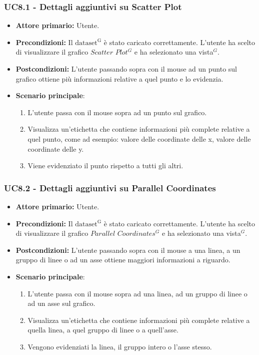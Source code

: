 \subsubsection{UC8.1 - Dettagli aggiuntivi su Scatter Plot}
\label{sec:UC8.1}
\begin{itemize}
    \item \textbf{Attore primario:} Utente.
    \item \textbf{Precondizioni:} Il ${\mathrm{dataset^{G}}}$ è stato caricato correttamente. L'utente ha scelto di visualizzare il grafico $Scatter$ $Plot^{G}$ e ha selezionato una vista$^{G}$.
    \item \textbf{Postcondizioni:} L'utente passando sopra con il mouse ad un punto sul grafico ottiene più informazioni relative a quel punto e lo evidenzia.
    \item \textbf{Scenario principale}: 
    \begin{enumerate}
		\item L'utente passa con il mouse sopra ad un punto sul grafico.
		\item Visualizza un'etichetta che contiene informazioni più complete relative a quel punto, come ad esempio: valore delle coordinate delle x, valore delle coordinate delle y. 
		\item Viene evidenziato il punto rispetto a tutti gli altri.
	\end{enumerate}
\end{itemize}

\subsubsection{UC8.2 - Dettagli aggiuntivi su Parallel Coordinates}
\label{sec:UC8.2}
\begin{itemize}
    \item \textbf{Attore primario:} Utente.
    \item \textbf{Precondizioni:} Il ${\mathrm{dataset^{G}}}$ è stato caricato correttamente. L'utente ha scelto di visualizzare il grafico $Parallel$ $Coordinates^{G}$ e ha selezionato una vista$^{G}$.
    \item \textbf{Postcondizioni:} L'utente passando sopra con il mouse a una linea, a un gruppo di linee o ad un asse ottiene maggiori informazioni a riguardo.
    \item \textbf{Scenario principale}:
    \begin{enumerate}
		\item L'utente passa con il mouse sopra ad una linea, ad un gruppo di linee o ad un asse sul grafico.
		\item Visualizza un'etichetta che contiene informazioni più complete relative a quella linea, a quel gruppo di linee o a quell'asse.
		\item Vengono evidenziati la linea, il gruppo intero o l'asse stesso.
	\end{enumerate}
\end{itemize}

